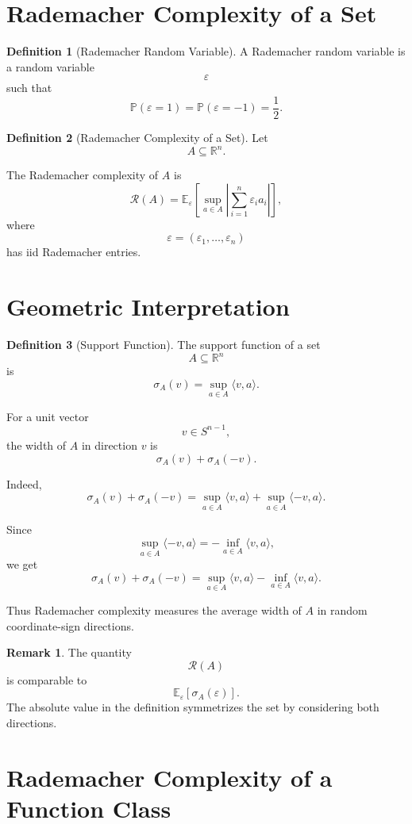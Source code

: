 \documentclass[12pt,oneside]{book}
\numberwithin{equation}{section}
\theoremstyle{definition}
\newtheorem{definition}{Definition}[section]
\newtheorem{remark}{Remark}[section]
\theoremstyle{plain}
\theoremstyle{remark}
\newcommand{\R}{\mathbb{R}}
\newcommand{\E}{\mathbb{E}}
\newcommand{\Prob}{\mathbb{P}}
\begin{document}
\section{Rademacher Complexity of a Set}

\begin{definition}[Rademacher Random Variable]
A Rademacher random variable is a random variable
\[
\varepsilon
\]
such that
\[
\Prob(\varepsilon=1)=\Prob(\varepsilon=-1)=\frac{1}{2}.
\]
\end{definition}

\begin{definition}[Rademacher Complexity of a Set]
Let
\[
A\subseteq\R^n.
\]

The Rademacher complexity of $A$ is
\[
\mathcal{R}(A)
=
\E_{\varepsilon}
\left[
\sup_{a\in A}
\left|
\sum_{i=1}^n \varepsilon_i a_i
\right|
\right],
\]
where
\[
\varepsilon=(\varepsilon_1,\dots,\varepsilon_n)
\]
has iid Rademacher entries.
\end{definition}

\section{Geometric Interpretation}

\begin{definition}[Support Function]
The support function of a set
\[
A\subseteq\R^n
\]
is
\[
\sigma_A(v)
=
\sup_{a\in A}
\langle v,a\rangle.
\]
\end{definition}

For a unit vector
\[
v\in S^{n-1},
\]
the width of $A$ in direction $v$ is
\[
\sigma_A(v)+\sigma_A(-v).
\]

Indeed,
\[
\sigma_A(v)+\sigma_A(-v)
=
\sup_{a\in A}\langle v,a\rangle
+
\sup_{a\in A}\langle -v,a\rangle.
\]

Since
\[
\sup_{a\in A}\langle -v,a\rangle
=
-\inf_{a\in A}\langle v,a\rangle,
\]
we get
\[
\sigma_A(v)+\sigma_A(-v)
=
\sup_{a\in A}\langle v,a\rangle
-
\inf_{a\in A}\langle v,a\rangle.
\]

Thus Rademacher complexity measures the average width of $A$ in random coordinate-sign directions.

\begin{remark}
The quantity
\[
\mathcal{R}(A)
\]
is comparable to
\[
\E_{\varepsilon}[\sigma_A(\varepsilon)].
\]
The absolute value in the definition symmetrizes the set by considering both directions.
\end{remark}

\section{Rademacher Complexity of a Function Class}
\end{document}
